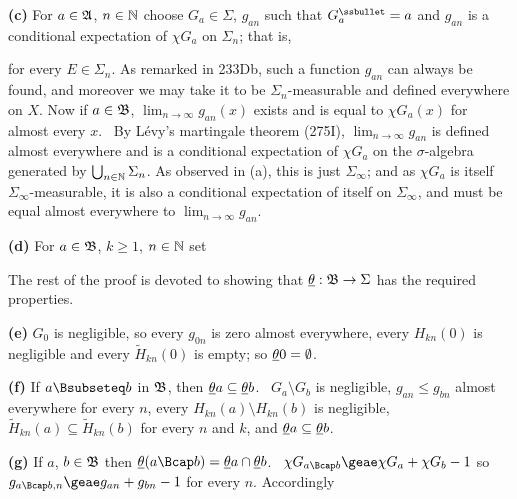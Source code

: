 {\medskip

{\bf (c)} For $a\in\frak A$, $n\in\Bbb N$ choose $G_a\in\Sigma$,
$g_{an}$ such that $G_a^{\ssbullet}=a$ and $g_{an}$ is a conditional
expectation of $\chi G_a$ on $\Sigma_n$;  that is,


\noindent for every $E\in\Sigma_n$.   As remarked in 233Db, such a
function $g_{an}$ can always be found, and moreover we may take it to be
$\Sigma_n$-measurable and defined everywhere on $X$.
Now if $a\in\frak B$, $\lim_{n\to\infty}g_{an}(x)$ exists and is equal
to $\chi G_a(x)$ for almost every $x$.   \Prf\ By L\'evy's martingale
theorem (275I), $\lim_{n\to\infty}g_{an}$ is defined almost everywhere
and is a conditional expectation of $\chi G_a$ on the $\sigma$-algebra
generated by $\bigcup_{n\in\Bbb N}\Sigma_n$.   As observed in (a), this
is just $\Sigma_{\infty}$;  and as $\chi G_a$ is itself
$\Sigma_{\infty}$-measurable, it is also a conditional expectation of
itself on $\Sigma_{\infty}$, and must be equal almost everywhere to
$\lim_{n\to\infty}g_{an}$.\ \Qed

\medskip

{\bf (d)} For $a\in\frak B$, $k\ge 1$, $n\in\Bbb N$ set



\noindent The rest of the proof is devoted to showing that
$\underline{\theta}:\frak B\to\Sigma$ has the required properties.

\medskip

{\bf (e)} $G_0$ is negligible, so every $g_{0n}$ is zero almost
everywhere, every $H_{kn}(0)$ is negligible and every $\tilde H_{kn}(0)$
is empty;  so $\underline{\theta} 0=\emptyset$.

\medskip

{\bf (f)} If $a\Bsubseteq b$ in $\frak B$, then $\underline{\theta} a\subseteq
\underline{\theta} b$.  \Prf\  $G_a\setminus G_b$ is negligible, $g_{an}\le
g_{bn}$ almost everywhere for every $n$, every $H_{kn}(a)\setminus
H_{kn}(b)$ is negligible, $\tilde H_{kn}(a)\subseteq\tilde H_{kn}(b)$
for every $n$ and $k$, and $\underline{\theta} a\subseteq \underline{\theta} b$.\ \Qed

\medskip

{\bf (g)}  If $a$, $b\in\frak B$ then $\undtheta(a\Bcap b)=\undtheta
a\cap\undtheta b$.
\Prf\ $\chi G_{a\Bcap b}\geae\chi G_a+\chi G_b-1$ so
$g_{a\Bcap b,n}\geae g_{an}+g_{bn}-1$ for every $n$.   Accordingly

}
